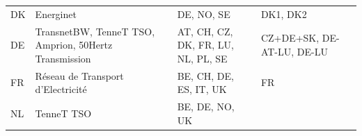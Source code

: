 \begin{longtable}[]{@{}llll@{}}
\begin{minipage}[t]{0.07\columnwidth}\raggedright
DK\strut
\end{minipage} & \begin{minipage}[t]{0.37\columnwidth}\raggedright
Energinet\strut
\end{minipage} & \begin{minipage}[t]{0.22\columnwidth}\raggedright
DE, NO, SE\strut
\end{minipage} & \begin{minipage}[t]{0.22\columnwidth}\raggedright
DK1, DK2\strut
\end{minipage}\tabularnewline
\begin{minipage}[t]{0.07\columnwidth}\raggedright
DE\strut
\end{minipage} & \begin{minipage}[t]{0.37\columnwidth}\raggedright
TransnetBW, TenneT TSO, Amprion, 50Hertz Transmission\strut
\end{minipage} & \begin{minipage}[t]{0.22\columnwidth}\raggedright
AT, CH, CZ, DK, FR, LU, NL, PL, SE\strut
\end{minipage} & \begin{minipage}[t]{0.22\columnwidth}\raggedright
CZ+DE+SK, DE-AT-LU, DE-LU\strut
\end{minipage}\tabularnewline
\begin{minipage}[t]{0.07\columnwidth}\raggedright
FR\strut
\end{minipage} & \begin{minipage}[t]{0.37\columnwidth}\raggedright
Réseau de Transport d'Electricité\strut
\end{minipage} & \begin{minipage}[t]{0.22\columnwidth}\raggedright
BE, CH, DE, ES, IT, UK\strut
\end{minipage} & \begin{minipage}[t]{0.22\columnwidth}\raggedright
FR\strut
\end{minipage}\tabularnewline
\begin{minipage}[t]{0.07\columnwidth}\raggedright
NL\strut
\end{minipage} & \begin{minipage}[t]{0.37\columnwidth}\raggedright
TenneT TSO\strut
\end{minipage} & \begin{minipage}[t]{0.22\columnwidth}\raggedright
BE, DE, NO, UK\strut
\end{minipage} & \begin{minipage}[t]{0.22\columnwidth}\raggedright

\end{minipage}
\end{longtable}
